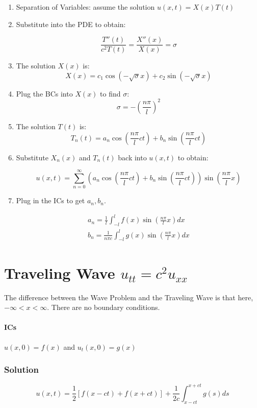 \documentclass[11pt]{article}
\begin{document}
\begin{enumerate}

\item Separation of Variables: assume the solution $u(x,t) = X(x)T(t)$
\item Substitute into the PDE to obtain:

$$ \frac{T''(t)}{c^2T(t)} = \frac{X''(x)}{X(x)} = \sigma $$

\item The solution $X(x)$ is:
$$ X(x) = c_1\cos(-\sqrt{\sigma}x) + c_2\sin(-\sqrt{\sigma}x) $$

\item Plug the BCs into $X(x)$ to find $\sigma$:
$$ \sigma = -(\frac{n\pi}{l})^2 $$

\item The solution $T(t)$ is:
$$ T_n(t) = a_n\cos(\frac{n\pi}{l}ct) + b_n\sin(\frac{n\pi}{l}ct) $$

\item Substitute $X_n(x)$ and $T_n(t)$ back into $u(x,t)$ to obtain:

$$ u(x,t) = \sum \limits_{n=0}^{\infty} \left( a_n\cos(\frac{n\pi}{l}ct) + b_n\sin(\frac{n\pi}{l}ct) \right) \sin(\frac{n\pi}{l}x)$$

\item Plug in the ICs to get $a_n, b_n$.

\begin{gather*}
a_n = \frac{1}{l} \int_{-l}^{l} f(x) \sin(\frac{n\pi}{l}x) dx \\
b_n = \frac{1}{n\pi c} \int_{-l}^{l} g(x) \sin(\frac{n\pi}{l}x) dx
\end{gather*}

\end{enumerate}



\section{Traveling Wave $u_{tt}=c^2u_{xx}$}
The difference between the Wave Problem and the Traveling Wave is that here, $-\infty<x<\infty$. There are no boundary conditions.
\paragraph{ICs} $u(x,0) = f(x)$ and $u_t(x,0) = g(x)$

\subsubsection*{Solution}
$$u(x,t) = \frac{1}{2} [ f(x-ct) + f(x+ct)] + \frac{1}{2c} \int_{x-ct}^{x+ct} g(s) ds $$
\end{document}
